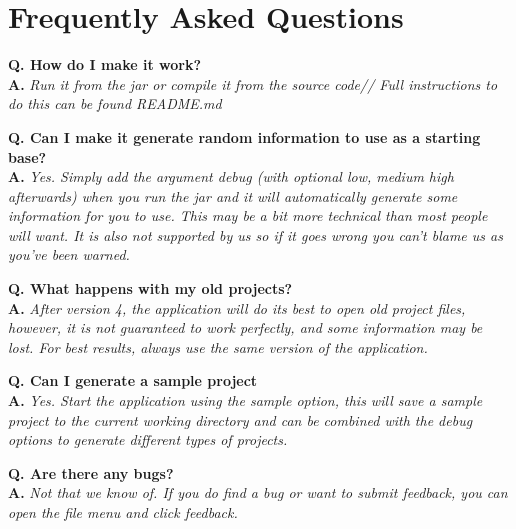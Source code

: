 \section{Frequently Asked Questions}

\newcommand{\faqentry}[2]{\textbf{Q. #1}\\  \textbf{A.} \textit{#2}\vspace{0.5cm}}


\faqentry{How do I make it work?}{Run it from the jar or compile it from the source code//
	Full instructions to  do this can be found README.md}

\faqentry{Can I make it generate random information to use as a starting base?}{Yes. Simply add the argument debug (with optional low, medium high afterwards) when you run the jar and it will automatically generate some information for you to use. This may be a bit more technical than most people will want. It is also not supported by us so if it goes wrong you can't blame us as you've been warned.}

\faqentry{What happens with my old projects?}{After version 4, the application will do its best to open old project files, however, it is not guaranteed to work perfectly, and some information may be lost. For best results, always use the same version of the application.}

\faqentry{Can I generate a sample project}{Yes. Start the application using the sample option, this will save a sample project to the current working directory and can be combined with the debug options to generate different types of projects.}

\faqentry{Are there any bugs?}
{
Not that we know of.\newline
If you do find a bug or want to submit feedback, you can open the file menu and click feedback.
}